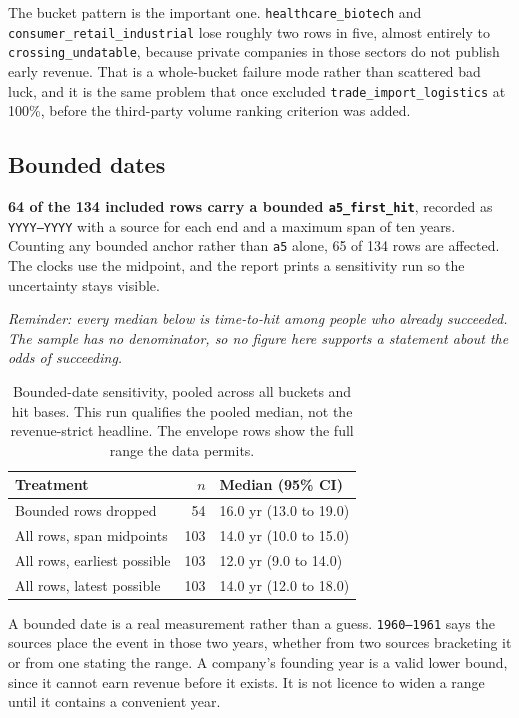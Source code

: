 \documentclass[11pt]{article}
\newcommand{\caveat}{\emph{\small Reminder: every median below is time-to-hit
among people who already succeeded. The sample has no denominator, so no figure
here supports a statement about the odds of succeeding.}\par\medskip}
\begin{document}
The bucket pattern is the important one. \texttt{healthcare\_biotech} and
\texttt{consumer\_retail\_industrial} lose roughly two rows in five, almost
entirely to \texttt{crossing\_undatable}, because private companies in those
sectors do not publish early revenue. That is a whole-bucket failure mode
rather than scattered bad luck, and it is the same problem that once excluded
\texttt{trade\_import\_logistics} at 100\%, before the third-party volume
ranking criterion was added.

\subsection{Bounded dates}

\textbf{64 of the 134 included rows carry a bounded
\texttt{a5\_first\_hit}}, recorded as \texttt{YYYY--YYYY} with a source for
each end and a maximum span of ten years. Counting any bounded anchor rather
than \texttt{a5} alone, 65 of 134 rows are affected. The clocks use the
midpoint, and the report prints a sensitivity run so the uncertainty stays
visible.

\caveat

\begin{table}[h]
\centering
\begin{tabular}{lrl}
\toprule
Treatment & $n$ & Median (95\% CI) \\
\midrule
Bounded rows dropped        & 54  & 16.0 yr (13.0 to 19.0) \\
All rows, span midpoints    & 103 & 14.0 yr (10.0 to 15.0) \\
All rows, earliest possible & 103 & 12.0 yr (9.0 to 14.0) \\
All rows, latest possible   & 103 & 14.0 yr (12.0 to 18.0) \\
\bottomrule
\end{tabular}
\caption{Bounded-date sensitivity, pooled across all buckets and hit bases.
This run qualifies the pooled median, not the revenue-strict headline. The
envelope rows show the full range the data permits.}
\end{table}

A bounded date is a real measurement rather than a guess. \texttt{1960--1961}
says the sources place the event in those two years, whether from two sources
bracketing it or from one stating the range. A company's founding year is a
valid lower bound, since it cannot earn revenue before it exists. It is not
licence to widen a range until it contains a convenient year.
\end{document}
